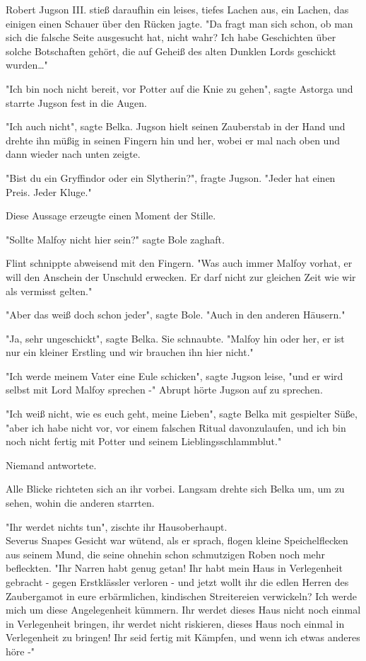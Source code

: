 {Robert Jugson III. stieß daraufhin ein leises, tiefes Lachen aus, ein Lachen, das einigen einen Schauer über den Rücken jagte. "Da fragt man sich schon, ob man sich die falsche Seite ausgesucht hat, nicht wahr? Ich habe Geschichten über solche Botschaften gehört, die auf Geheiß des alten Dunklen Lords geschickt wurden…"

"Ich bin noch nicht bereit, vor Potter auf die Knie zu gehen", sagte Astorga und starrte Jugson fest in die Augen.

"Ich auch nicht", sagte Belka. Jugson hielt seinen Zauberstab in der Hand und drehte ihn müßig in seinen Fingern hin und her, wobei er mal nach oben und dann wieder nach unten zeigte.

"Bist du ein Gryffindor oder ein Slytherin?", fragte Jugson. "Jeder hat einen Preis. Jeder Kluge."

Diese Aussage erzeugte einen Moment der Stille.

"Sollte Malfoy nicht hier sein?" sagte Bole zaghaft.

Flint schnippte abweisend mit den Fingern. "Was auch immer Malfoy vorhat, er will den Anschein der Unschuld erwecken. Er darf nicht zur gleichen Zeit wie wir als vermisst gelten."

"Aber das weiß doch schon jeder", sagte Bole. "Auch in den anderen Häusern."

"Ja, sehr ungeschickt", sagte Belka. Sie schnaubte. "Malfoy hin oder her, er ist nur ein kleiner Erstling und wir brauchen ihn hier nicht."

"Ich werde meinem Vater eine Eule schicken", sagte Jugson leise, "und er wird selbst mit Lord Malfoy sprechen -" Abrupt hörte Jugson auf zu sprechen.

"Ich weiß nicht, wie es euch geht, meine Lieben", sagte Belka mit gespielter Süße, "aber ich habe nicht vor, vor einem falschen Ritual davonzulaufen, und ich bin noch nicht fertig mit Potter und seinem Lieblingsschlammblut."

Niemand antwortete.

Alle Blicke richteten sich an ihr vorbei. Langsam drehte sich Belka um, um zu sehen, wohin die anderen starrten.

"Ihr werdet nichts tun", zischte ihr Hausoberhaupt.\\ Severus Snapes Gesicht war wütend, als er sprach, flogen kleine Speichelflecken aus seinem Mund, die seine ohnehin schon schmutzigen Roben noch mehr befleckten. "Ihr Narren habt genug getan! Ihr habt mein Haus in Verlegenheit gebracht - gegen Erstklässler verloren - und jetzt wollt ihr die edlen Herren des Zaubergamot in eure erbärmlichen, kindischen Streitereien verwickeln? Ich werde mich um diese Angelegenheit kümmern. Ihr werdet dieses Haus nicht noch einmal in Verlegenheit bringen, ihr werdet nicht riskieren, dieses Haus noch einmal in Verlegenheit zu bringen! Ihr seid fertig mit Kämpfen, und wenn ich etwas anderes höre -"

}
